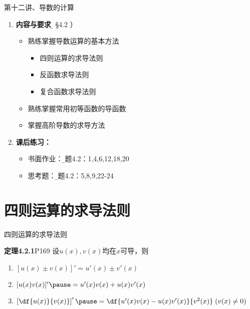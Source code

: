 \begin{frame}{第十二讲、导数的计算}
	\linespread{1.5}
	\begin{enumerate}
	  \item {\bf 内容与要求}{\b（ \S4.2 ）}
	  \begin{itemize}
	    \item 熟练掌握导数运算的基本方法
	    \begin{itemize}
	      \item 四则运算的求导法则
	      \item 反函数求导法则
	      \item 复合函数求导法则
	    \end{itemize}
	    \item 熟练掌握常用初等函数的导函数
	    \item 掌握高阶导数的求导方法
	  \end{itemize}
	  \item {\bf 课后练习：}
	  \begin{itemize}
	    \item 书面作业：{\b 习题4.2：1,4,6,12,18,20}
	    \item 思考题：{\b 习题4.2：5,8,9,22-24}
	  \end{itemize}
	\end{enumerate}
\end{frame}

\section{四则运算的求导法则}

\begin{frame}{四则运算的求导法则}
	\linespread{2}\pause 
	\begin{block}{{\bf 定理4.2.1}\hfill P169}\pause 
		设$u(x),v(x)$均在$x$可导，则
		\begin{enumerate}
		  \item $[u(x)\pm v(x)]'=u'(x)\pm v'(x)$\pause 
		  \item $[u(x)v(x)]'\pause =u'(x)v(x)+u(x)v'(x)$\pause 
		  \item
		  $\left[\df{u(x)}{v(x)}\right]'\pause
		  =\df{u'(x)v(x)-u(x)v'(x)}{v^2(x)}\;(v(x)\ne 0)$
		\end{enumerate}
	\end{block}
\end{frame}

